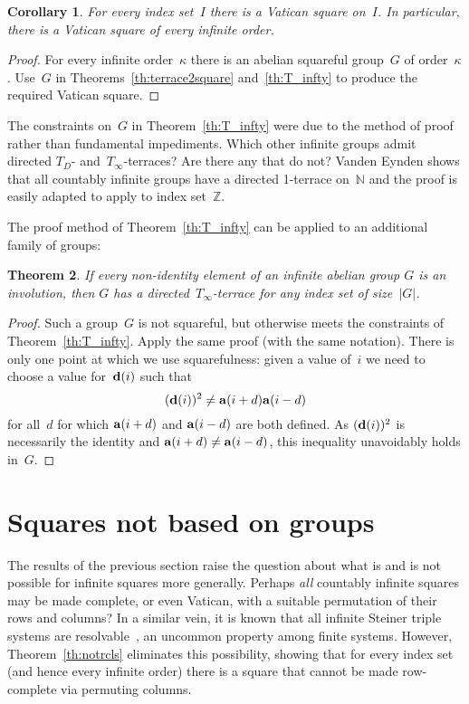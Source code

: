 \documentclass[12pt,a4paper]{article}
\newtheorem{thm}{Theorem}[section]
\newtheorem{cor}[thm]{Corollary}
\newcommand{\Z}{\mathbb{Z}}
\newcommand{\N}{\mathbb{N}}
\renewcommand{\a}{\textup{\textbf{a}}}
\renewcommand{\d}{\textup{\textbf{d}}}
\begin{document}
\begin{cor}\label{cor:vatsquares}
For every index set~$I$ there is a Vatican square on~$I$.  In particular, there is a Vatican square of every infinite order.
\end{cor}

\begin{proof}
For every infinite order~$\kappa$ there is an abelian squareful group~$G$ of order~$\kappa$. Use~$G$ in Theorems~\ref{th:terrace2square} and~\ref{th:T_infty} to produce the required Vatican square.
\end{proof}

The constraints on~$G$ in Theorem~\ref{th:T_infty} were due to the method of proof rather than fundamental impediments.  Which other  infinite groups admit directed $T_D$- and~$T_{\infty}$-terraces?  Are there any that do not?  Vanden Eynden shows that all countably infinite groups have a directed 1-terrace on~$\N$ \cite{VE78} and the proof is easily adapted to apply to index set~$\Z$.  

The proof method of Theorem~\ref{th:T_infty} can be applied to an additional family of groups:

\begin{thm}\label{th:allinv}
If every non-identity element of an infinite abelian group $G$ is an involution, then $G$ has a directed~$T_{\infty}$-terrace for any index set of size~$|G|$. 
\end{thm}

\begin{proof}
Such a group~$G$ is not squareful, but otherwise meets the constraints of Theorem~\ref{th:T_infty}.  Apply the same proof (with the same notation).  There is only one point at which we use squarefulness: given a value of~$i$ we need to choose a value for~${\bf d}(i)$ such that
$$(\d(i))^2 \neq \a(i+d)\a(i-d)$$
for all~$d$ for which $\a(i+d)$ and $\a(i-d)$ are both defined.  As $(\d(i))^2$ is necessarily the identity and $\a(i+d) \neq \a(i-d)$, this inequality unavoidably holds in~$G$.
\end{proof}



\section{Squares not based on groups}\label{sec:notgp}



The results of the previous section raise the question about what is and is not possible for infinite squares more generally.   Perhaps {\em all} countably infinite squares may be made complete, or even Vatican, with a suitable permutation of their rows and columns?   In a similar vein, it is known that all infinite Steiner triple systems are resolvable~\cite{DHW14}, an uncommon property among finite systems. However, Theorem~\ref{th:notrcls} eliminates this possibility, showing that for every index set (and hence every infinite order) there is a square that cannot be made row-complete via permuting columns.
\end{document}
